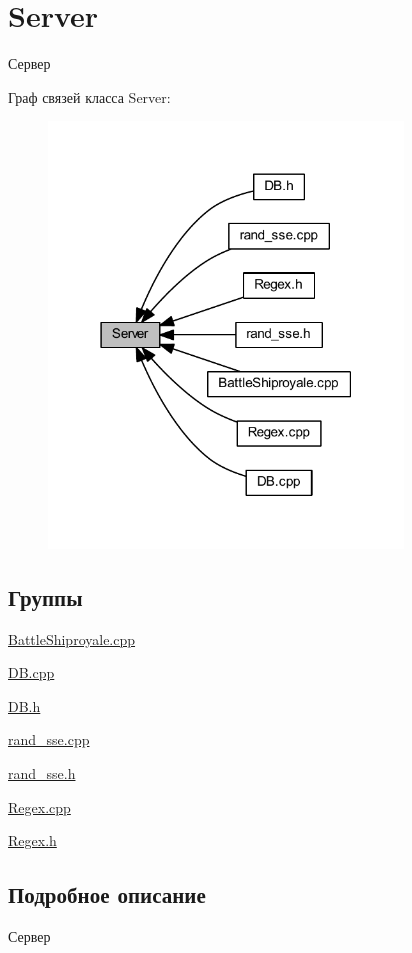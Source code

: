 \hypertarget{group__server}{}\section{Server}
\label{group__server}


Сервер  


Граф связей класса Server\+:
\nopagebreak
\begin{figure}[H]
\begin{center}
\leavevmode
\includegraphics[width=267pt]{group__server}
\end{center}
\end{figure}
\subsection*{Группы}
\begin{DoxyCompactItemize}
\item 
\mbox{\hyperlink{group__battleshiproyalecpp}{Battle\+Shiproyale.\+cpp}}
\item 
\mbox{\hyperlink{group__dbcpp}{D\+B.\+cpp}}
\item 
\mbox{\hyperlink{group__dbh}{D\+B.\+h}}
\item 
\mbox{\hyperlink{group__rand__ssecpp}{rand\+\_\+sse.\+cpp}}
\item 
\mbox{\hyperlink{group__rand__sseh}{rand\+\_\+sse.\+h}}
\item 
\mbox{\hyperlink{group__regexcpp}{Regex.\+cpp}}
\item 
\mbox{\hyperlink{group__regexh}{Regex.\+h}}
\end{DoxyCompactItemize}


\subsection{Подробное описание}
Сервер 

